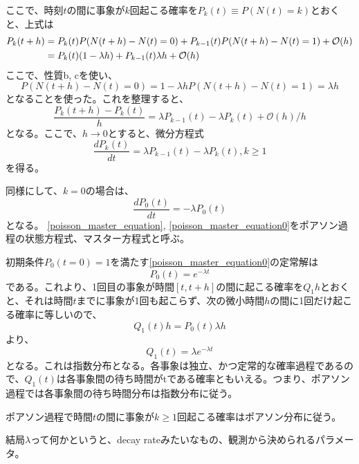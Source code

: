 ここで、時刻$t$の間に事象が$k$回起こる確率を$P_k(t)\equiv P(N(t)=k)$とおくと、上式は
\begin{align}
    P_k(t+h)
    & = P_k(t)P(N(t+h)-N(t)=0) + P_{k-1}(t)P(N(t+h)-N(t)=1) + \mathcal{O}(h)\notag \\
    & = P_k(t)(1-\lambda h) + P_{k-1}(t)\lambda h + \mathcal{O}(h)
\end{align}
ここで、性質b, cを使い、
\begin{equation}
    P(N(t+h)-N(t)=0) = 1-\lambda h
    P(N(t+h)-N(t)=1) = \lambda h
\end{equation}
となることを使った。これを整理すると、
\begin{equation}
    \frac{P_k(t+h) - P_k(t)}{h}
     = \lambda P_{k-1}(t) - \lambda P_k(t) + \mathcal{O}(h) / h
\end{equation}
となる。ここで、$h\to0$とすると、微分方程式
\begin{equation}\label{poisson_master_equation}
    \frac{dP_{k}(t)}{dt} = \lambda P_{k-1}(t) - \lambda P_k(t), k\geq1
\end{equation}
を得る。

同様にして、$k=0$の場合は、
\begin{equation}\label{poisson_master_equation0}
    \frac{dP_{0}(t)}{dt} = -\lambda  P_0(t)
\end{equation}
となる。
\eqref{poisson_master_equation}, \eqref{poisson_master_equation0}をポアソン過程の状態方程式、マスター方程式と呼ぶ。

初期条件$P_0(t=0)=1$を満たす\eqref{poisson_master_equation0}の定常解は
\begin{equation}
    P_0(t) = e^{-\lambda t}
\end{equation}
である。これより、1回目の事象が時間$[t, t+h]$の間に起こる確率を$Q_1 h$とおくと、それは時間$t$までに事象が1回も起こらず、次の微小時間$h$の間に1回だけ起こる確率に等しいので、
\begin{equation}
    Q_1(t) h = P_0(t) \lambda h
\end{equation}
より、
\begin{equation}
    Q_1(t) = \lambda e^{-\lambda t}
\end{equation}
となる。これは指数分布となる。各事象は独立、かつ定常的な確率過程であるので、$Q_1(t)$は各事象間の待ち時間がtである確率ともいえる。つまり、ポアソン過程では各事象間の待ち時間分布は指数分布に従う。

ポアソン過程で時間$t$の間に事象が$k\geq1$回起こる確率はポアソン分布に従う。

結局$\lambda$って何かというと、decay rateみたいなもの、観測から決められるパラメータ。

